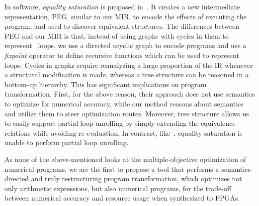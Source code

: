 In software, \emph{equality saturation} is proposed in~\cite{tate09}.  It
creates a new intermediate representation, PEG, similar to our MIR, to
encode the effects of executing the program, and used to discover equivalent
structures.  The differences between PEG and our MIR is that, instead of using
graphs with cycles in them to represent \whilelit~loops, we use a directed
acyclic graph to encode programs and use a \emph{fixpoint} operator to define
recursive functions which can be used to represent loops.  Cycles in graphs
require reanalyzing a large proportion of the IR whenever a structural
modification is made, whereas a tree structure can be reasoned in a bottom-up
hierarchy.  This has significant implications on program transformation.
First, for the above reason, their approach does not use semantics to optimize
for numerical accuracy, while our method reasons about semantics and utilize
them to steer optimization routes.  Moreover, tree structure allows us to
easily support partial loop unrolling by simply extending the equivalence
relations while avoiding re-evaluation.  In contrast, like~\cite{martel09},
equality saturation is unable to perform partial loop unrolling.

As none of the above-mentioned looks at the multiple-objective optimization
of numerical programs, we are the first to propose a tool that performs a
semantics-directed and truly restructuring program transformation, which
optimizes not only arithmetic expressions, but also numerical programs, for the
trade-off between numerical accuracy and resource usage when synthesized to
FPGAs.
